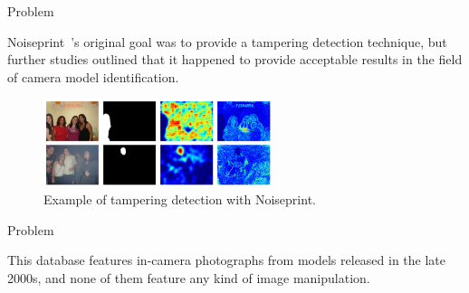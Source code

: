 \begin{frame}{Problem}

    Noiseprint~\cite{cozzolino2018noiseprint}'s original goal was to provide a tampering detection technique, but further studies outlined that it happened to provide acceptable results in the field of camera model identification.
    
    \medskip
    
    \begin{figure}
        \centering
        \includegraphics[width=0.6\textwidth]{../drawable/examples/example-tampering.png}
        \caption{Example of tampering detection with Noiseprint.}
    \end{figure}
    
    \medskip
    
    
\end{frame}
\begin{frame}{Problem}
    
    This database features in-camera photographs from models released in the late 2000s, and none of them feature any kind of image manipulation.
    
    \medskip

    
\end{frame}

